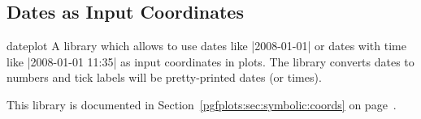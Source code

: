 \subsection{Dates as Input Coordinates}
\begin{pgfplotslibrary}{dateplot}
	A library which allows to use dates like |2008-01-01| or dates with time like |2008-01-01 11:35| as input coordinates in plots. The library converts dates to numbers and tick labels will be pretty-printed dates (or times).

	This library is documented in Section~\ref{pgfplots:sec:symbolic:coords} on page~\pageref{pgfplots:sec:date:coords}.
\end{pgfplotslibrary}
